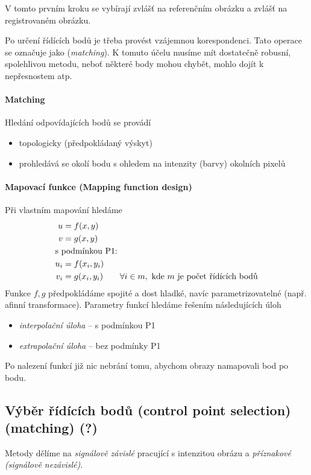 V tomto prvním kroku se vybírají zvlášť na referenčním obrázku a zvlášť na registrovaném obrázku.

Po určení řídících bodů je třeba provést vzájemnou korespondenci. Tato operace se označuje jako (\emph{matching}). 
K tomuto účelu musíme mít dostatečně robusní, spolehlivou metodu, neboť některé body mohou chybět, mohlo dojít
k nepřesnostem atp. 

\paragraph{Matching}

Hledání odpovídajících bodů se provádí
\begin{itemize} 
\item topologicky (předpokládaný výskyt)
\item prohledává se okolí bodu s ohledem na intenzity (barvy) okolních pixelů
\end{itemize}

\paragraph{Mapovací funkce (Mapping function design)}

Při vlastním mapování hledáme
\begin{align}
u &= f(x,y)\\
v &= g(x,y)\\
\noalign{\hbox{s podmínkou P1:}\nonumber}
u_i &= f(x_i,y_i)\\
v_i &= g(x_i,y_i)\qquad\forall i\in m,\ \hbox{kde $m$ je počet řídících bodů}
\end{align}
Funkce $f,g$ předpokládáme spojité a dost hladké, navíc parametrizovatelné (např. afinní transformace). 
Parametry funkcí hledáme řešením následujících úloh
\begin{itemize}
\item \emph{interpolační úloha} -- s podmínkou P1
\item \emph{extrapolační úloha} -- bez podmínky P1
\end{itemize}
Po nalezení funkcí již nic nebrání tomu, abychom obrazy namapovali bod po bodu.

\subsection{Výběr řídících bodů (control point selection) (matching) (?)}
Metody dělíme na \emph{signálově závislé} pracující s intenzitou obrázu a \emph{příznakové (signálově nezávislé)}.

